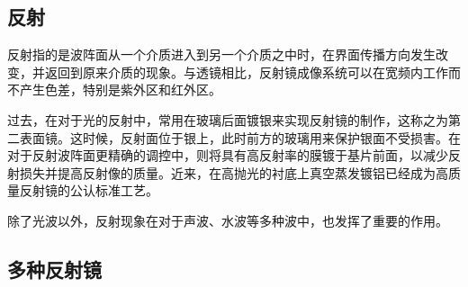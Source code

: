 \begin{issues}
\issueDraft
\issueMissDepend
\end{issues}

\subsection{反射}
反射指的是波阵面从一个介质进入到另一个介质之中时，在界面传播方向发生改变，并返回到原来介质的现象。与透镜相比，反射镜成像系统可以在宽频内工作而不产生色差，特别是紫外区和红外区。

过去，在对于光的反射中，常用在玻璃后面镀银来实现反射镜的制作，这称之为第二表面镜。这时候，反射面位于银上，此时前方的玻璃用来保护银面不受损害。在对于反射波阵面更精确的调控中，则将具有高反射率的膜镀于基片前面，以减少反射损失并提高反射像的质量。近来，在高抛光的衬底上真空蒸发镀铝已经成为高质量反射镜的公认标准工艺。

除了光波以外，反射现象在对于声波、水波等多种波中，也发挥了重要的作用。
\subsection{多种反射镜}


